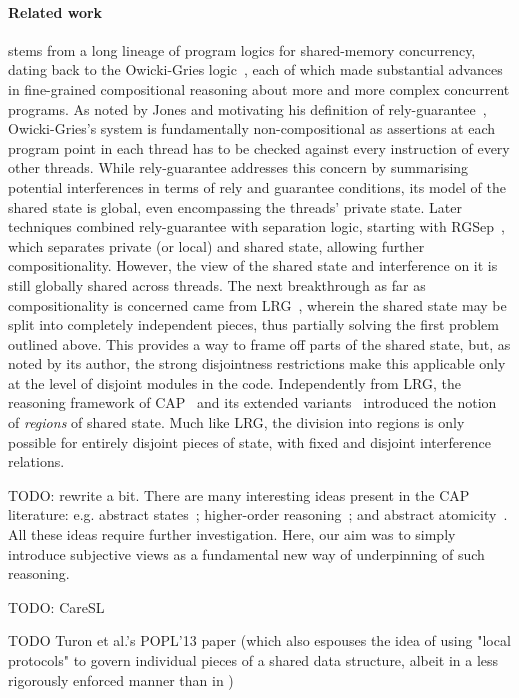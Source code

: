 \paragraph{Related work}
\colosl stems from a long lineage of program logics for shared-memory
concurrency, dating back to the Owicki-Gries logic~\cite{og}, each of
which made substantial advances in fine-grained compositional
reasoning about more and more complex concurrent programs. As noted by
Jones and motivating his definition of rely-guarantee~\cite{rg},
Owicki-Gries's system is fundamentally non-compositional as assertions
at each program point in each thread has to be checked against every
instruction of every other threads. While rely-guarantee addresses
this concern by summarising potential interferences in terms of rely
and guarantee conditions, its model of the shared state is global,
even encompassing the threads' private state. Later techniques
combined rely-guarantee with separation logic, starting with
RGSep~\cite{viktor-marriage}, which separates private (or local) and
shared state, allowing further compositionality. However, the view of
the shared state and interference on it is still globally shared
across threads. The next breakthrough as far as compositionality is
concerned came from LRG~\cite{lrg}, wherein the shared state may be
split into completely independent pieces, thus partially solving the
first problem outlined above. This provides a way to frame off parts
of the shared state, but, as noted by its author, the strong
disjointness restrictions make this applicable only at the level of
disjoint modules in the code. Independently from LRG, the reasoning
framework of CAP~\cite{cap-ecoop10}
and its extended variants~\cite{icap,tada} introduced the notion
of \emph{regions} of shared state. Much like LRG, the division into
regions is only possible for entirely disjoint pieces of state, with
fixed and disjoint interference relations.

TODO: rewrite a bit.
There are many interesting ideas present in the CAP literature:
e.g. abstract states~\cite{caresl}; higher-order
reasoning~\cite{icap}; and abstract atomicity~\cite{tada}. All these
ideas require further investigation. Here, our aim was to simply
introduce subjective views as a fundamental new way of underpinning of
such reasoning.

TODO: CareSL

TODO Turon et al.'s POPL'13 paper (which also espouses the idea of
using "local protocols" to govern individual pieces of a shared data
structure, albeit in a less rigorously enforced manner than in \colosl)

